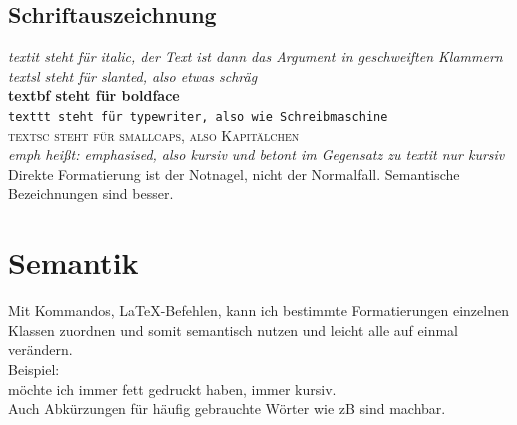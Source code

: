 \subsection{Schriftauszeichnung}
\label{sec:Schriftauszeichnung}



\noindent 
\textit{textit steht für italic, 
der Text ist dann das Argument in geschweiften Klammern}\\
\textsl{textsl steht für slanted, also etwas schräg}\\
\textbf{textbf steht für boldface}\\
\texttt{texttt steht für typewriter, also wie Schreibmaschine}\\
\textsc{textsc steht für smallcaps, also Kapitälchen}\\
\emph{emph heißt: emphasised, also kursiv und betont im Gegensatz zu textit nur kursiv}\\

Direkte Formatierung ist der Notnagel, nicht der Normalfall. Semantische 
Bezeichnungen sind besser.


\section{Semantik}

Mit Kommandos, LaTeX-Befehlen, kann ich bestimmte Formatierungen einzelnen Klassen
zuordnen und somit semantisch nutzen und leicht alle auf einmal verändern. \\
Beispiel: \\
 möchte ich immer fett gedruckt haben,  immer kursiv. \\
Auch Abkürzungen für häufig gebrauchte Wörter wie zB \LG sind machbar. \\
